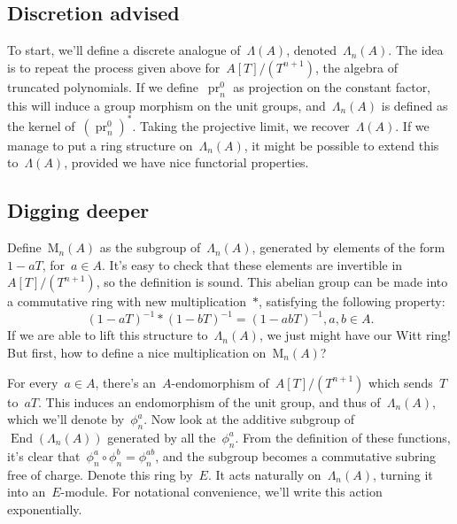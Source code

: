 \subsection{Discretion advised}
To start, we'll define a discrete analogue of~$\Lambda(A)$, denoted~$\Lambda_{n}(A)$. The idea is to repeat the process given above for~$A[T]/(T^{n+1})$, the algebra of truncated polynomials. If we define~$\operatorname{pr}_{n}^{0}$ as projection on the constant factor, this will induce a group morphism on the unit groups, and~$\Lambda_{n}(A)$ is defined as the kernel of~$(\operatorname{pr}_{n}^{0})^{*}$. Taking the projective limit, we recover~$\Lambda(A)$. If we manage to put a ring structure on~$\Lambda_{n}(A)$, it might be possible to extend this to~$\Lambda(A)$, provided we have nice functorial properties.

\subsection{Digging deeper}

Define~$\mathrm{M}_{n}(A)$ as the subgroup of~$\Lambda_{n}(A)$, generated by elements of the form~$1-aT$, for~$a \in A$. It's easy to check that these elements are invertible in~$A[T]/(T^{n+1})$, so the definition is sound. This abelian group can be made into a commutative ring with new multiplication~$\ast$, satisfying the following property:
\begin{equation}
  \label{equation:multiplication}
  (1-aT)^{-1} \ast (1-bT)^{-1} = (1-abT)^{-1}, a,b \in A.
\end{equation}
If we are able to lift this structure to~$\Lambda_{n}(A)$, we just might have our Witt ring! But first, how to define a nice multiplication on~$\mathrm{M}_{n}(A)$?

For every~$a \in A$, there's an~$A$-endomorphism of~$A[T]/(T^{n+1})$ which sends~$T$ to~$aT$. This induces an endomorphism of the unit group, and thus of~$\Lambda_{n}(A)$, which we'll denote by~$\phi_{n}^{a}$. Now look at the additive subgroup of~$\operatorname{End}(\Lambda_{n}(A))$ generated by all the~$\phi_{n}^{a}$. From the definition of these functions, it's clear that~$\phi_{n}^{a} \circ \phi_{n}^{b}=\phi_{n}^{ab}$, and the subgroup becomes a commutative subring free of charge. Denote this ring by~$E$. It acts naturally on~$\Lambda_{n}(A)$, turning it into an~$E$-module. For notational convenience, we'll write this action exponentially.

